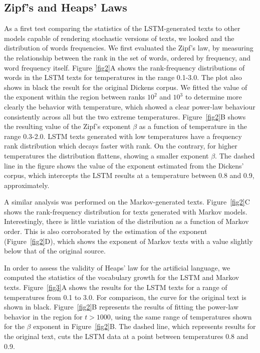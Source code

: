 \documentclass[journal]{IEEEtran}
\begin{document}
\subsection{Zipf's and Heaps' Laws}
As a first test comparing the statistics of the LSTM-generated texts to other
models capable of rendering stochastic versions of texts, we looked and the
distribution of words frequencies.
We first evaluated the Zipf's law, by measuring the relationship between the
rank in the set of words, ordered by frequency, and word frequency itself.
Figure~\ref{fig2}A shows the rank-frequency distributions of
words in the LSTM texts for temperatures in the range 0.1-3.0. The
plot also shows in black the result for the original Dickens corpus. We fitted the value of the exponent within the
region between ranks $10^2$ and $10^3$ to determine more clearly the behavior
with temperature, which showed a clear power-law behaviour consistently across all
but the two extreme temperatures. Figure~\ref{fig2}B shows the resulting value of the Zipf's
exponent $\beta$ as a function of temperature in the range 0.3-2.0. LSTM texts
generated with low temperatures have a frequency rank distribution which decays
faster with rank. On the contrary, for higher
temperatures the distribution flattens, showing a smaller exponent $\beta$. The
dashed line in the figure shows the value of the exponent estimated
from the Dickens' corpus, which intercepts the LSTM results at a
temperature between 0.8 and 0.9, approximately.

A similar analysis was performed on the Markov-generated texts.
Figure~\ref{fig2}C shows the rank-frequency distribution for texts generated
with Markov
models. Interestingly, there is little
variation of the distribution as a function of Markov
order. This is also corroborated by the estimation of the exponent (Figure~\ref{fig2}D), which shows the exponent of Markov texts with a value
slightly below that of the original source.

In order to assess the validity of Heaps' law for the artificial language,
we computed the statistics of the vocabulary growth for the LSTM and Markov texts.
%
Figure~\ref{fig3}A shows the results for the LSTM texts for a
range of temperatures from 0.1 to 3.0. For comparison, the curve for
the original text is shown in black. Figure~\ref{fig2}B represents the results
of
fitting the power-law behavior in the region for $t>1000$, using the same range
of temperatures shown for the $\beta$ exponent in Figure~\ref{fig2}B. The dashed
line, which represents results for the original text, cuts the LSTM data
at a point between temperatures 0.8 and 0.9.
\end{document}
